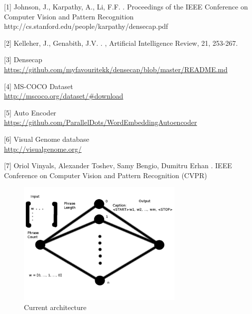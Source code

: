 \documentclass[11pt]{article}
\begin{document}
\begin{thebibliography}{}

[1] Johnson, J., Karpathy, A., Li, F.F.
.
\newblock Proceedings of the IEEE Conference on Computer Vision and Pattern Recognition http://cs.stanford.edu/people/karpathy/densecap.pdf

[2] Kelleher, J., Genabith, J.V.
.
,
\newblock Artificial Intelligence Review, 21, 253-267.

[3] Densecap\\
\url {https://github.com/myfavouritekk/densecap/blob/master/README.md}

[4] MS-COCO Dataset\\
\url {http://mscoco.org/dataset/#download}

[5] Auto Encoder\\
\url {https://github.com/ParallelDots/WordEmbeddingAutoencoder}

[6] Visual Genome database\\
\url {http://visualgenome.org/}

[7] Oriol Vinyals, Alexander Toshev, Samy Bengio, Dumitru Erhan
.
\newblock IEEE Conference on Computer Vision and Pattern Recognition (CVPR)

\end{thebibliography}
\begin{figure}
\includegraphics[width=8cm]{Untitled}
\caption{Current architecture}
\end{figure}
\end{document}
